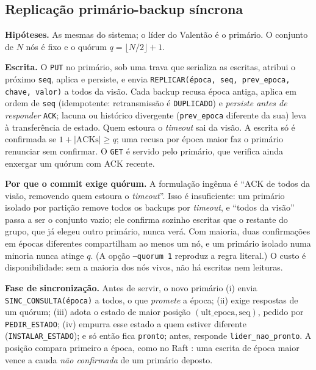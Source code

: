 \documentclass[conference,a4paper]{IEEEtran}
\begin{document}
\subsection{Replicação primário-backup síncrona}

\textbf{Hipóteses.} As mesmas do sistema; o líder do Valentão é o primário. O
conjunto de $N$ nós é fixo e o quórum $q=\lfloor N/2\rfloor+1$.

\textbf{Escrita.} O \texttt{PUT} no primário, sob uma trava que serializa as
escritas, atribui o próximo \texttt{seq}, aplica e persiste, e envia
\texttt{REPLICAR(época, seq, prev\_epoca, chave, valor)} a todos da visão.
Cada backup recusa época antiga, aplica em ordem de \texttt{seq}
(idempotente: retransmissão é \texttt{DUPLICADO}) e \emph{persiste antes de
responder} \texttt{ACK}; lacuna ou histórico divergente (\texttt{prev\_epoca}
diferente da sua) leva à transferência de estado. Quem estoura o \emph{timeout}
sai da visão. A escrita só é confirmada se $1+|\text{ACKs}|\ge q$; uma
recusa por época maior faz o primário renunciar sem confirmar. O \texttt{GET}
é servido pelo primário, que verifica ainda enxergar um quórum com ACK recente.

\textbf{Por que o commit exige quórum.} A formulação ingênua é
``ACK de todos da visão, removendo quem estoura o \emph{timeout}''. Isso é
insuficiente: um primário isolado por partição remove todos os backups por
\emph{timeout}, e ``todos da visão'' passa a ser o conjunto vazio; ele
confirma sozinho escritas que o restante do grupo, que já elegeu outro
primário, nunca verá. Com maioria, duas confirmações em épocas diferentes
compartilham ao menos um nó, e um primário isolado numa minoria nunca atinge
$q$. (A opção \texttt{--quorum 1} reproduz a regra literal.) O custo é
disponibilidade: sem a maioria dos nós vivos, não há escritas nem leituras.

\textbf{Fase de sincronização.} Antes de servir, o novo primário
(i) envia \texttt{SINC\_CONSULTA(época)} a todos, o que \emph{promete} a época;
(ii) exige respostas de um quórum; (iii) adota o estado de maior
posição $(\text{ult\_epoca},\text{seq})$, pedido por \texttt{PEDIR\_ESTADO};
(iv) empurra esse estado a quem estiver diferente (\texttt{INSTALAR\_ESTADO});
e só então fica \texttt{pronto}; antes, responde \texttt{lider\_nao\_pronto}.
A posição compara primeiro a época, como no Raft \cite{ongaro2014}: uma
escrita de época maior vence a cauda \emph{não confirmada} de um primário
deposto.
\end{document}
